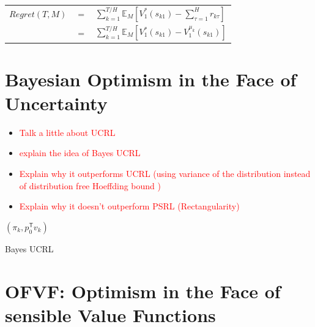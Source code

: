 \documentclass{article}
\newcommand{\tr}{^{\mathsf{T}}}
\newcommand*{\todo}{\textcolor{red}}
\theoremstyle{plain}
\theoremstyle{definition}
\begin{document}
\begin{tabular}{l l l}
	$Regret(T,M)$ & $=$ &$
	\sum_{k=1}^{T/H}\mathbb{E}_M[V_1^*(s_{k1})-\sum_{\tau=1}^Hr_{k\tau}]$\\
	&$=$&$ \sum_{k=1}^{T/H}\mathbb{E}_M[V_1^*(s_{k1})-V_1^{\mu_k}(s_{k1})]$
\end{tabular}

\section{Bayesian Optimism in the Face of Uncertainty}

\begin{itemize}
	\item \todo{Talk a little about UCRL}
	\item \todo{explain the idea of Bayes UCRL}
	\item \todo{Explain why it outperforms UCRL (using variance of the distribution instead of distribution free Hoeffding bound )}
	\item \todo{Explain why it doesn't outperform PSRL (Rectangularity)}
\end{itemize}


\begin{algorithm}
	\Return $(\pi_k, p_0\tr v_k)$ \;
	\caption{Bayes UCRL}    \label{alg:IAVF}
\end{algorithm}

\section{OFVF: Optimism in the Face of sensible Value Functions} \label{sec:multiple}
\end{document}
